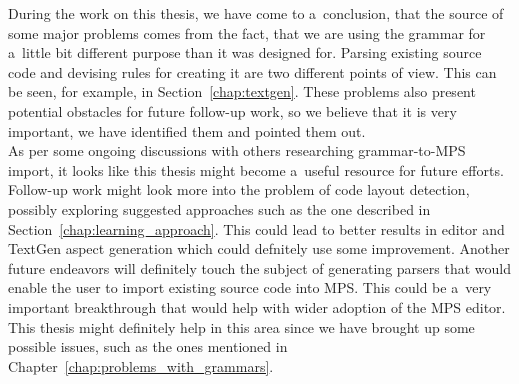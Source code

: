 During the work on this thesis, we have come to a~conclusion, that the source of some major problems comes from the fact, that we are using the grammar for a~little bit different purpose than it was designed for.
Parsing existing source code and devising rules for creating it are two different points of view.
This can be seen, for example, in Section~\ref{chap:textgen}.
These problems also present potential obstacles for future follow-up work, so we believe that it is very important, we have identified them and pointed them out.
\\

As per some ongoing discussions with others researching grammar-to-MPS import, it looks like this thesis might become a~useful resource for future efforts.
Follow-up work might look more into the problem of code layout detection, possibly exploring suggested approaches such as the one described in Section~\ref{chap:learning_approach}.
This could lead to better results in editor and TextGen aspect generation which could defnitely use some improvement.
Another future endeavors will definitely touch the subject of generating parsers that would enable the user to import existing source code into MPS.
This could be a~very important breakthrough that would help with wider adoption of the MPS editor.
This thesis might definitely help in this area since we have brought up some possible issues, such as the ones mentioned in Chapter~\ref{chap:problems_with_grammars}.
